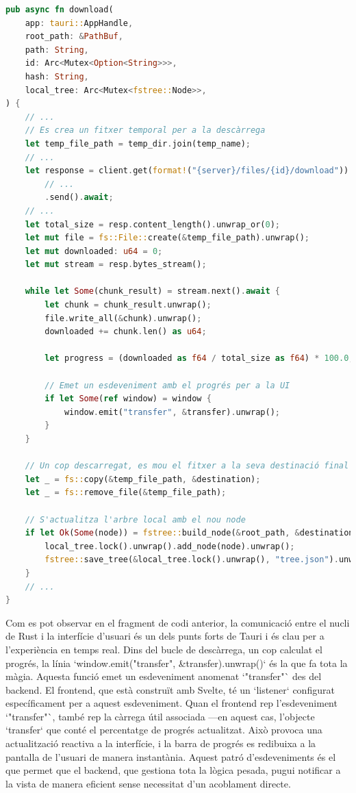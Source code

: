 \begin{lstlisting}[language=Rust, caption={Gestió de la descàrrega amb progrés a \texttt{api.rs}}]
pub async fn download(
    app: tauri::AppHandle,
    root_path: &PathBuf,
    path: String,
    id: Arc<Mutex<Option<String>>>,
    hash: String,
    local_tree: Arc<Mutex<fstree::Node>>,
) {
    // ...
    // Es crea un fitxer temporal per a la descàrrega
    let temp_file_path = temp_dir.join(temp_name);
    // ...
    let response = client.get(format!("{server}/files/{id}/download"))
        // ...
        .send().await;
    // ...
    let total_size = resp.content_length().unwrap_or(0);
    let mut file = fs::File::create(&temp_file_path).unwrap();
    let mut downloaded: u64 = 0;
    let mut stream = resp.bytes_stream();

    while let Some(chunk_result) = stream.next().await {
        let chunk = chunk_result.unwrap();
        file.write_all(&chunk).unwrap();
        downloaded += chunk.len() as u64;

        let progress = (downloaded as f64 / total_size as f64) * 100.0;
        
        // Emet un esdeveniment amb el progrés per a la UI
        if let Some(ref window) = window {
            window.emit("transfer", &transfer).unwrap();
        }
    }
    
    // Un cop descarregat, es mou el fitxer a la seva destinació final
    let _ = fs::copy(&temp_file_path, &destination);
    let _ = fs::remove_file(&temp_file_path);

    // S'actualitza l'arbre local amb el nou node
    if let Ok(Some(node)) = fstree::build_node(&root_path, &destination).map(Some) {
        local_tree.lock().unwrap().add_node(node).unwrap();
        fstree::save_tree(&local_tree.lock().unwrap(), "tree.json").unwrap();
    }
    // ...
}
\end{lstlisting}

Com es pot observar en el fragment de codi anterior, la comunicació entre el nucli de Rust i la interfície d'usuari és un dels punts forts de Tauri i és clau per a l'experiència en temps real. Dins del bucle de descàrrega, un cop calculat el progrés, la línia `window.emit("transfer", \&transfer).unwrap()` és la que fa tota la màgia. Aquesta funció emet un esdeveniment anomenat `"transfer"` des del backend. El frontend, que està construït amb Svelte, té un `listener` configurat específicament per a aquest esdeveniment. Quan el frontend rep l'esdeveniment `"transfer"`, també rep la càrrega útil associada —en aquest cas, l'objecte `transfer` que conté el percentatge de progrés actualitzat. Això provoca una actualització reactiva a la interfície, i la barra de progrés es redibuixa a la pantalla de l'usuari de manera instantània. Aquest patró d'esdeveniments és el que permet que el backend, que gestiona tota la lògica pesada, pugui notificar a la vista de manera eficient sense necessitat d'un acoblament directe.

